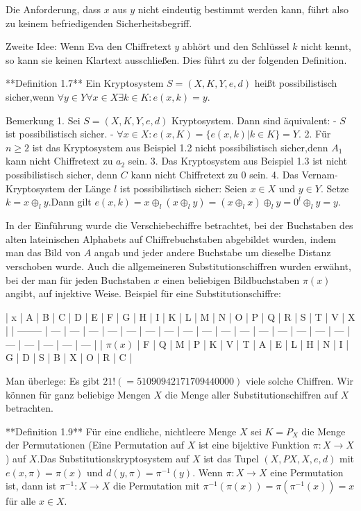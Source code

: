 \documentclass[a4paper]{article}
\begin{document}
\begin{multicols}{3}
    Die Anforderung, dass $x$ aus $y$ nicht eindeutig bestimmt werden kann, führt also zu keinem befriedigenden Sicherheitsbegriff.

    Zweite Idee: Wenn Eva den Chiffretext $y$ abhört und den Schlüssel $k$ nicht kennt, so kann sie keinen Klartext ausschließen. Dies führt zu der folgenden Definition.

    **Definition 1.7** Ein Kryptosystem $S=(X,K,Y,e,d)$ heißt possibilistisch sicher,wenn $\forall y\in Y\forall x\in X\exists k\in K:e(x,k)=y$.

    Bemerkung
    1. Sei $S=(X,K,Y,e,d)$ Kryptosystem. Dann sind äquivalent:
    - $S$ ist possibilistisch sicher.
    - $\forall x\in X:e(x,K)=\{e(x,k)|k\in K\}=Y$.
    2. Für $n\geq 2$ ist das Kryptosystem aus Beispiel 1.2 nicht possibilistisch sicher,denn $A_1$ kann nicht Chiffretext zu $a_2$ sein.
    3. Das Kryptosystem aus Beispiel 1.3 ist nicht possibilistisch sicher, denn $C$ kann nicht Chiffretext zu $0$ sein.
    4. Das Vernam-Kryptosystem der Länge $l$ ist possibilistisch sicher: Seien $x\in X$ und $y\in Y$. Setze $k=x\oplus_l y$.Dann gilt $e(x,k)=x\oplus_l(x\oplus_l y)=(x\oplus_l x)\oplus_l y= 0^l\oplus_l y=y$.

    In der Einführung wurde die Verschiebechiffre betrachtet, bei  der Buchstaben des alten lateinischen Alphabets auf  Chiffrebuchstaben abgebildet wurden, indem man das Bild von $A$ angab und jeder andere Buchstabe um dieselbe Distanz verschoben wurde. Auch die allgemeineren Substitutionschiffren wurden erwähnt, bei der man für jeden Buchstaben $x$ einen beliebigen Bildbuchstaben $\pi(x)$ angibt, auf injektive Weise. Beispiel für eine Substitutionschiffre:

    | x        | A   | B   | C   | D   | E   | F   | G   | H   | I   | K   | L   | M   | N   | O   | P   | Q   | R   | S   | T   | V   | X   |
    | -------- | --- | --- | --- | --- | --- | --- | --- | --- | --- | --- | --- | --- | --- | --- | --- | --- | --- | --- | --- | --- | --- |
    | $\pi(x)$ | F   | Q   | M   | P   | K   | V   | T   | A   | E   | L   | H   | N   | I   | G   | D   | S   | B   | X   | O   | R   | C   |

    Man überlege: Es gibt $21!(= 51090942171709440000)$ viele solche Chiffren. Wir können für ganz beliebige Mengen $X$ die Menge aller Substitutionschiffren auf $X$ betrachten.

    **Definition 1.9** Für eine endliche, nichtleere Menge $X$ sei $K=P_X$ die Menge der Permutationen (Eine Permutation auf $X$ ist eine bijektive Funktion $\pi:X\rightarrow X$) auf $X$.Das Substitutionskryptosystem auf $X$ ist das Tupel $(X,PX,X,e,d)$
    mit $e(x,\pi)=\pi(x)$ und $d(y,\pi)=\pi^{-1} (y)$.
    Wenn $\pi:X\rightarrow X$ eine Permutation ist, dann ist $\pi^{-1}:X\rightarrow X$ die Permutation mit $\pi^{-1}(\pi(x))=\pi(\pi^{-1}(x)) =x$ für alle $x\in X$.


\end{multicols}
\end{document}

